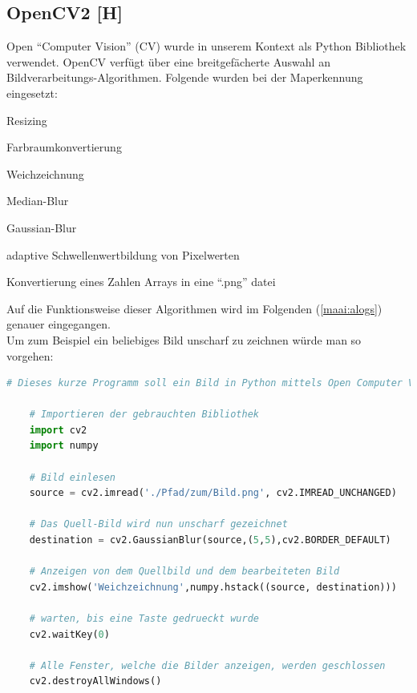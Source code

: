 \subsection{OpenCV2 [H]}
Open ``Computer Vision'' (CV) wurde in unserem Kontext als Python Bibliothek verwendet. OpenCV verfügt über eine
breitgefächerte Auswahl an Bildverarbeitungs-Algorithmen.
Folgende wurden bei der Maperkennung eingesetzt:
\begin{compactitem}
    \item Resizing
    \item Farbraumkonvertierung
    \item Weichzeichnung
    \begin{compactitem}
        \item Median-Blur
        \item Gaussian-Blur
    \end{compactitem}
    \item adaptive Schwellenwertbildung von Pixelwerten
    \item Konvertierung eines Zahlen Arrays in eine ``.png'' datei
\end{compactitem}
Auf die Funktionsweise dieser Algorithmen wird im Folgenden (\ref{maai:alogs}) genauer eingegangen.
\\
Um zum Beispiel ein beliebiges Bild unscharf zu zeichnen würde man so vorgehen:
\\

\begin{lstlisting}[language=Python,caption=OpenCV Demo,label=lst:tech:gaussianBlur]
    # Dieses kurze Programm soll ein Bild in Python mittels Open Computer Vision weichzeichnen
    
    # Importieren der gebrauchten Bibliothek
    import cv2
    import numpy
    
    # Bild einlesen
    source = cv2.imread('./Pfad/zum/Bild.png', cv2.IMREAD_UNCHANGED)
    
    # Das Quell-Bild wird nun unscharf gezeichnet
    destination = cv2.GaussianBlur(source,(5,5),cv2.BORDER_DEFAULT)

    # Anzeigen von dem Quellbild und dem bearbeiteten Bild 
    cv2.imshow('Weichzeichnung',numpy.hstack((source, destination)))

    # warten, bis eine Taste gedrueckt wurde
    cv2.waitKey(0) 

    # Alle Fenster, welche die Bilder anzeigen, werden geschlossen
    cv2.destroyAllWindows() 
\end{lstlisting}


